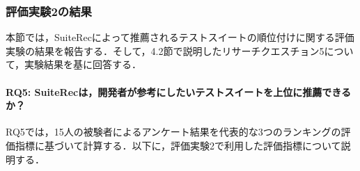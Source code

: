 \documentclass[12pt]{jarticle} %
\begin{document}
\subsubsection{評価実験2の結果}
\label{sec:E2evaluation}

本節では，{\sf SuiteRec}によって推薦されるテストスイートの順位付けに関する評価実験の結果を報告する．そして，4.2節で説明したリサーチクエスチョン5について，実験結果を基に回答する．

\paragraph{RQ5: SuiteRecは，開発者が参考にしたいテストスイートを上位に推薦できるか？}
RQ5では，15人の被験者によるアンケート結果を代表的な3つのランキングの評価指標に基づいて計算する．以下に，評価実験2で利用した評価指標について説明する．
\end{document}
